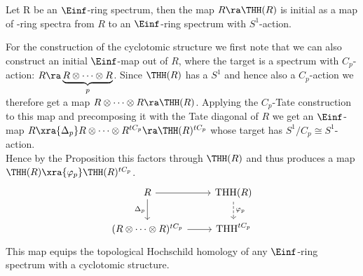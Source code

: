 \begin{prop}
Let R be an $\Einf$-ring spectrum, then the map $R\ra \THH(R)$ is initial as a map of \Einf-ring spectra from $R$ to an $\Einf$-ring spectrum with $S^1$-action.
\end{prop}
For the construction of the cyclotomic structure we first note that we can also construct an initial $\Einf$-map out of $R$, where the target is a spectrum with $C_p$-action: $R\ra \underbrace{R\otimes\dots\otimes R}_{p}$.
Since $\THH(R)$ has a $S^1$ and hence also a $C_p$-action we therefore get a map $R\otimes\dots\otimes R\ra \THH(R)$. Applying the $C_p$-Tate construction to this map and precomposing it with the Tate diagonal of $R$ we get an $\Einf$-map $R\xra{\Delta_p} R\otimes\dots\otimes R^{tC_p}\ra \THH(R)^{tC_p}$ whose target has $S^1/C_p\cong S^1$-action.
\\
Hence by the Proposition this factors through $\THH(R)$ and thus produces a map $\THH(R)\xra{\varphi_p} \THH(R)^{tC_p}$.
\[\begin{tikzcd}
	{R} & {\text{THH}(R)} \\
	{(R\otimes\dots\otimes R)^{tC_p}} & {\text{THH}^{tC_p}}
	\arrow[from=1-1, to=1-2]
	\arrow["{\varphi_p}", from=1-2, to=2-2, dashed]
	\arrow["{\Delta_p}"', from=1-1, to=2-1]
	\arrow[from=2-1, to=2-2]
\end{tikzcd}\]
This map equips the topological Hochschild homology of any $\Einf$-ring spectrum with a cyclotomic structure. 
